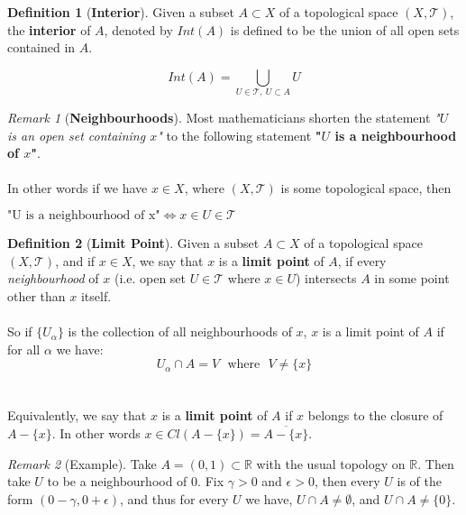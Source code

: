 \documentclass{article}
\theoremstyle{remark}
\newtheorem*{remark}{Remark}
\theoremstyle{definition}
\newtheorem{definition}{Definition}[section]
\begin{document}
\begin{definition}[\textbf{Interior}]
Given a subset $A \subset X$ of a topological space $(X , \mathcal{T})$, the \textbf{interior} of $A$, denoted by $Int(A)$ is defined to be the union of all open sets contained in $A$.

$$Int(A) = \bigcup_{U \in \mathcal{T} , \  U \subset A} U $$

\end{definition}

\medskip

\begin{remark}[\textbf{Neighbourhoods}]
Most mathematicians shorten the statement \textit{"$U$ is an open set containing $x$"} to the following statement \textbf{"$U$ is a neighbourhood of $x$"}.
\\ \\
In other words if we have $x \in X$, where $(X, \mathcal{T})$ is some topological space, then 
\begin{center}
$\text{"U \ is \ a \ neighbourhood \ of \ x"} \iff x \in U \in \mathcal{T}$ 
\end{center}
\end{remark}

\medskip

\newpage

\begin{definition}[\textbf{Limit Point}]
Given a subset $A \subset X$ of a topological space $(X , \mathcal{T})$, and if $x \in X$,  we say that $x$ is a \textbf{limit point} of $A$, if every \textit{neighbourhood} of $x$ (i.e. open set $U \in \mathcal{T}$ where $x \in U$) intersects $A$ in some point other than $x$ itself. \\ \\ So if $\{U_{\alpha}\}$ is the collection of all neighbourhoods of $x$, $x$ is a limit point of $A$ if for all $\alpha$ we have: $$U_{\alpha} \cap A = V \ \ \ \text{where} \ \ \   V \neq \{x\}$$
\\ \\
Equivalently, we say that $x$ is a \textbf{limit point} of $A$ if $x$ belongs to the closure of $A - \{x\}$. In other words $x \in Cl\left(A - \{x\}\right) = \overline{A - \{x\}}$. \\

\end{definition}

\begin{remark}[Example]
Take $A =(0,1) \subset \mathbb{R}$ with the usual topology on $\mathbb{R}$. Then take $U$ to be a neighbourhood of $0$. Fix $\gamma > 0$ and $\epsilon > 0$, then every $U$ is of the form $(0 - \gamma, 0 + \epsilon)$, and thus for every $U$ we have, $U \cap A \neq \emptyset$, and $U \cap A \neq \{0\}$.
\end{remark}
\end{document}
